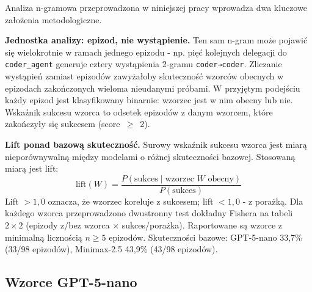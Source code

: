 Analiza n-gramowa przeprowadzona w niniejszej pracy wprowadza dwa kluczowe założenia metodologiczne.

\textbf{Jednostka analizy: epizod, nie wystąpienie.} Ten sam n-gram może pojawić się wielokrotnie w ramach jednego epizodu - np. pięć kolejnych delegacji do \texttt{coder\_agent} generuje cztery wystąpienia 2-gramu \texttt{coder→coder}. Zliczanie wystąpień zamiast epizodów zawyżałoby skuteczność wzorców obecnych w epizodach zakończonych wieloma nieudanymi próbami. W przyjętym podejściu każdy epizod jest klasyfikowany binarnie: wzorzec jest w nim obecny lub nie. Wskaźnik sukcesu wzorca to odsetek epizodów z danym wzorcem, które zakończyły się sukcesem (score~$\geq$~2).

\textbf{Lift ponad bazową skuteczność.} Surowy wskaźnik sukcesu wzorca jest miarą nieporównywalną między modelami o różnej skuteczności bazowej. Stosowaną miarą jest lift:
\[
  \mathrm{lift}(W) = \frac{P(\text{sukces} \mid \text{wzorzec } W \text{ obecny})}{P(\text{sukces})}
\]
Lift $> 1{,}0$ oznacza, że wzorzec koreluje z sukcesem; lift $< 1{,}0$ - z porażką. Dla każdego wzorca przeprowadzono dwustronny test dokładny Fishera na tabeli $2 \times 2$ (epizody z/bez wzorca $\times$ sukces/porażka). Raportowane są wzorce z minimalną licznością $n \geq 5$ epizodów. Skuteczności bazowe: GPT-5-nano 33,7\% (33/98 epizodów), Minimax-2.5 43,9\% (43/98 epizodów).

\subsection{Wzorce GPT-5-nano}
\label{subsec:wzorce-gpt}

